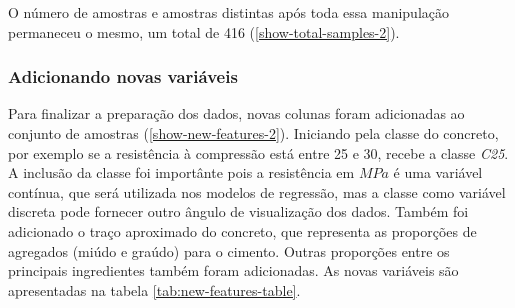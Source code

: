 \documentclass[]{article}
\begin{document}
\begin{table}[H]

\caption{\label{tab:new-features}Primeiras 6 amostras reorganizadas}
\centering
{}
\end{table}

O número de amostras e amostras distintas após toda essa manipulação
permaneceu o mesmo, um total de 416 (\ref{show-total-samples-2}).

\hypertarget{adicionando-novas-variuxe1veis}{%
\subsubsection{Adicionando novas
variáveis}\label{adicionando-novas-variuxe1veis}}

Para finalizar a preparação dos dados, novas colunas foram adicionadas
ao conjunto de amostras (\ref{show-new-features-2}). Iniciando pela
classe do concreto, por exemplo se a resistência à compressão está entre
25 e 30, recebe a classe \emph{C25}. A inclusão da classe foi importânte
pois a resistência em \(MPa\) é uma variável contínua, que será
utilizada nos modelos de regressão, mas a classe como variável discreta
pode fornecer outro ângulo de visualização dos dados. Também foi
adicionado o traço aproximado do concreto, que representa as proporções
de agregados (miúdo e graúdo) para o cimento. Outras proporções entre os
principais ingredientes também foram adicionadas. As novas variáveis são
apresentadas na tabela \ref{tab:new-features-table}.
\end{document}
